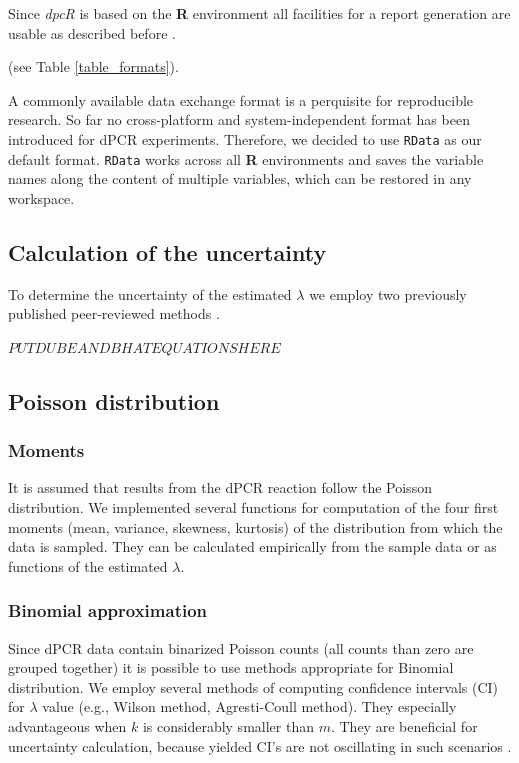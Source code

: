 \documentclass[a4,center,fleqn]{NAR}
\begin{document}
Since \textit{dpcR} is based on the \textbf{R} environment all facilities for a 
report generation are usable as described before \cite{rodiger_r_2015}.

(see Table \ref{table_formats}).

A commonly available data exchange format is a perquisite for reproducible 
research. So far no cross-platform and system-independent format has been 
introduced for dPCR experiments. Therefore, we decided to use \texttt{RData} as 
our default format. \texttt{RData} works across all \textbf{R} environments and 
saves the variable names along the content of multiple variables, which can be 
restored in any workspace.

\subsection{Calculation of the uncertainty}

To determine the uncertainty of the estimated $\lambda$ we employ two previously 
published peer-reviewed methods \cite{dube_mathematical_2008, bhat_single_2009}.

$PUTDUBEANDBHATEQUATIONSHERE$

\subsection{Poisson distribution}


\subsubsection{Moments}
It is assumed that results from the dPCR reaction follow the Poisson 
distribution. We implemented several functions for computation of the four first 
moments (mean, variance, skewness, kurtosis) of the distribution from which the 
data is sampled. They can be calculated empirically from the sample data or as 
functions of the estimated $\lambda$.

\subsubsection{Binomial approximation}
Since dPCR data contain binarized Poisson 
counts (all counts than zero are grouped together) it is possible to use methods 
appropriate for Binomial distribution. We employ several methods of computing 
confidence intervals (CI) for $\lambda$ value (e.g., Wilson method, 
Agresti-Coull method). They especially advantageous when $k$ is considerably 
smaller than $m$. They are beneficial for uncertainty calculation, because 
yielded CI's are not oscillating in such scenarios \cite{brown_2001}.
\end{document}
